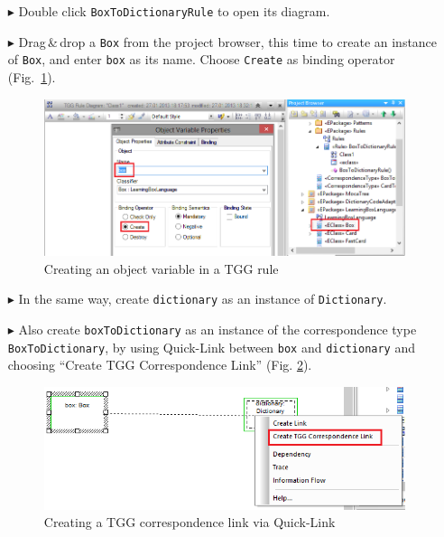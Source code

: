 \begin{enumerate}
\item[$\blacktriangleright$] Double click \texttt{BoxToDictionaryRule} to open its diagram.

\item[$\blacktriangleright$] Drag\,\&\,drop a \texttt{Box} from the project browser, this time to create an instance of \texttt{Box}, and enter \texttt{box} as its name.
Choose \texttt{Create} as binding operator (Fig.~\ref{fig:create_tgg_object}).

\begin{figure}[htbp]
\begin{center}
  \includegraphics[width=\textwidth]{pics/tggBilder/tggRule/tgg10}
  \caption{Creating an object variable in a TGG rule}
  \label{fig:create_tgg_object}
\end{center}
\end{figure}

\item[$\blacktriangleright$] In the same way, create \texttt{dictionary} as an instance of \texttt{Dictionary}.

\item[$\blacktriangleright$] Also create \texttt{boxToDictionary} as an instance of the correspondence type \texttt{BoxToDictionary}, by using Quick-Link between \texttt{box} and \texttt{dictionary} and choosing ``Create TGG Correspondence Link'' (Fig. \ref{fig:create_tgg_correspondence_link}).

\begin{figure}[htbp]
\begin{center}
  \includegraphics[width=\textwidth]{pics/tggBilder/tggRule/create_tgg_correspondence_link.png}
  \caption{Creating a TGG correspondence link via Quick-Link}
  \label{fig:create_tgg_correspondence_link}
\end{center}
\end{figure}
\FloatBarrier

\end{enumerate}

